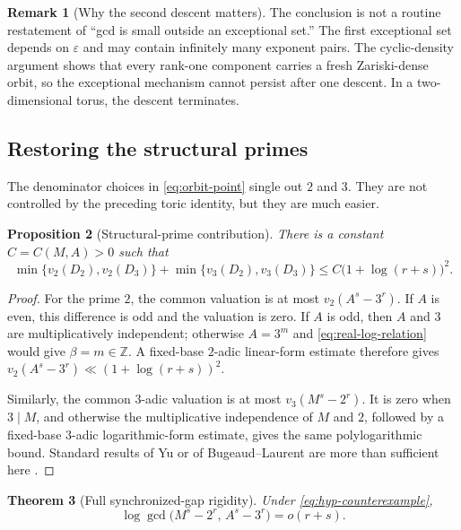 \documentclass[11pt,oneside]{article}
\newtheorem{theorem}{Theorem}[section]
\newtheorem{proposition}[theorem]{Proposition}
\theoremstyle{definition}
\newtheorem{remark}[theorem]{Remark}
\newcommand{\Z}{\mathbb{Z}}
\newcommand{\eps}{\varepsilon}
\begin{document}
\begin{remark}[Why the second descent matters]
The conclusion is not a routine restatement of ``gcd is small outside an
exceptional set.''  The first exceptional set depends on $\eps$ and may
contain infinitely many exponent pairs.  The cyclic-density argument
shows that every rank-one component carries a fresh Zariski-dense orbit,
so the exceptional mechanism cannot persist after one descent.  In a
two-dimensional torus, the descent terminates.
\end{remark}

\subsection{Restoring the structural primes}

The denominator choices in \eqref{eq:orbit-point} single out $2$ and $3$.
They are not controlled by the preceding toric identity, but they are
much easier.

\begin{proposition}[Structural-prime contribution]\label{prop:structural-primes}
There is a constant $C=C(M,A)>0$ such that
\begin{equation}\label{eq:structural-bound}
  \min\{v_2(D_2),v_2(D_3)\}
  +\min\{v_3(D_2),v_3(D_3)\}
  \le C\bigl(1+\log(r+s)\bigr)^2.
\end{equation}
\end{proposition}

\begin{proof}
For the prime $2$, the common valuation is at most $v_2(A^s-3^r)$.  If
$A$ is even, this difference is odd and the valuation is zero.  If $A$ is
odd, then $A$ and $3$ are multiplicatively independent; otherwise
$A=3^m$ and \eqref{eq:real-log-relation} would give $\beta=m\in\Z$.
A fixed-base $2$-adic linear-form estimate therefore gives
$v_2(A^s-3^r)\ll(1+\log(r+s))^2$.

Similarly, the common $3$-adic valuation is at most $v_3(M^s-2^r)$.  It
is zero when $3\mid M$, and otherwise the multiplicative independence of
$M$ and $2$, followed by a fixed-base $3$-adic logarithmic-form estimate,
gives the same polylogarithmic bound.  Standard results of Yu or of
Bugeaud--Laurent are more than sufficient here \cite{Yu1998,BL1996}.
\end{proof}

\begin{theorem}[Full synchronized-gap rigidity]\label{thm:full-gcd}
Under \eqref{eq:hyp-counterexample},
\begin{equation}\label{eq:full-gcd-main}
  \boxed{\displaystyle
  \log\gcd\bigl(M^s-2^r,\,A^s-3^r\bigr)=o(r+s).}
\end{equation}
\end{theorem}
\end{document}
